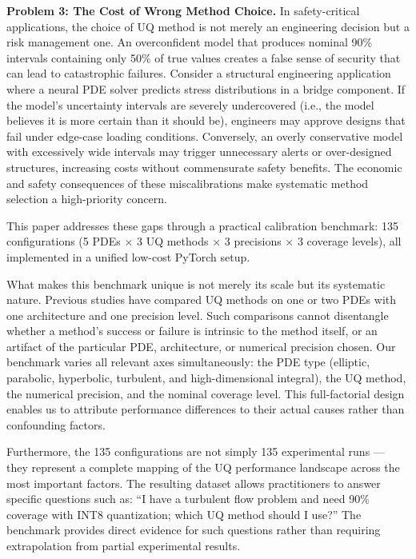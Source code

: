 \documentclass[12pt,a4paper]{article}
\theoremstyle{plain}
\begin{document}
\textbf{Problem 3: The Cost of Wrong Method Choice.}
In safety-critical applications, the choice of UQ method is not merely an
engineering decision but a risk management one. An overconfident model
that produces nominal 90\% intervals containing only 50\% of true values
creates a false sense of security that can lead to catastrophic failures.
Consider a structural engineering application where a neural PDE solver
predicts stress distributions in a bridge component. If the model's
uncertainty intervals are severely undercovered (i.e., the model believes
it is more certain than it should be), engineers may approve designs that
fail under edge-case loading conditions. Conversely, an overly conservative
model with excessively wide intervals may trigger unnecessary alerts or
over-designed structures, increasing costs without commensurate safety
benefits. The economic and safety consequences of these miscalibrations
make systematic method selection a high-priority concern.

This paper addresses these gaps through a practical calibration benchmark:
135 configurations (5 PDEs $\times$ 3 UQ methods $\times$ 3 precisions $\times$ 3 coverage levels),
all implemented in a unified low-cost PyTorch setup.

What makes this benchmark unique is not merely its scale but its systematic
nature. Previous studies have compared UQ methods on one or two PDEs with
one architecture and one precision level. Such comparisons cannot disentangle
whether a method's success or failure is intrinsic to the method itself,
or an artifact of the particular PDE, architecture, or numerical precision
chosen. Our benchmark varies all relevant axes simultaneously: the PDE type
(elliptic, parabolic, hyperbolic, turbulent, and high-dimensional integral),
the UQ method, the numerical precision, and the nominal coverage level. This
full-factorial design enables us to attribute performance differences to
their actual causes rather than confounding factors.

Furthermore, the 135 configurations are not simply 135 experimental runs ---
they represent a complete mapping of the UQ performance landscape across
the most important factors. The resulting dataset allows practitioners to
answer specific questions such as: ``I have a turbulent flow problem and need
90\% coverage with INT8 quantization; which UQ method should I use?'' The
benchmark provides direct evidence for such questions rather than requiring
extrapolation from partial experimental results.
\end{document}
